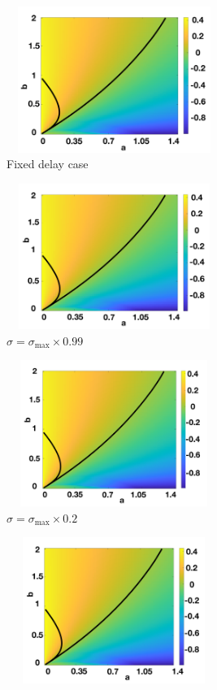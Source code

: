 \begin{figure}[H]
    \centering
    \begin{subfigure}[t]{0.45\textwidth}
        \centering
        \includegraphics[width=7cm,height=4.75cm]{t1f1.png}
        \caption{Fixed delay case}
        \label{}
    \end{subfigure}
    \hfill
    \begin{subfigure}[t]{0.45\textwidth}
        \centering
        \includegraphics[width=7cm,height=4.75cm]{t1f2.png}
        \caption{$\sigma=\sigma_{\max}\times0.99$}
        \label{}
    \end{subfigure}
    \hfill
    \begin{subfigure}[t]{0.45\textwidth}
        \centering
        \includegraphics[width=7cm,height=4.75cm]{t1f3.png}
        \caption{$\sigma=\sigma_{\max}\times0.2$}
        \label{}
    \end{subfigure}
    \hfill
    \begin{subfigure}[t]{0.45\textwidth}
        \centering
        \includegraphics[width=7cm,height=4.75cm]{t1f4.png}

\end{subfigure}
\end{figure}
